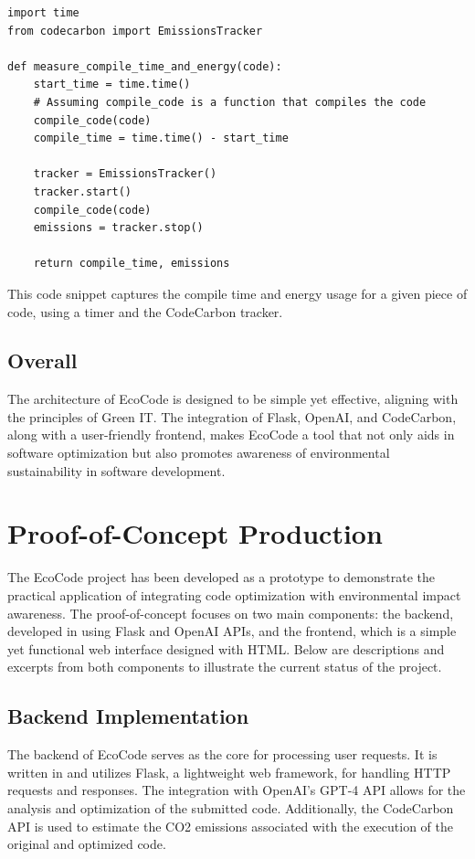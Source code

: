 \documentclass[conference,compsoc]{IEEEtran}
\begin{document}
\begin{verbatim}
import time
from codecarbon import EmissionsTracker

def measure_compile_time_and_energy(code):
    start_time = time.time()
    # Assuming compile_code is a function that compiles the code
    compile_code(code)
    compile_time = time.time() - start_time

    tracker = EmissionsTracker()
    tracker.start()
    compile_code(code)
    emissions = tracker.stop()

    return compile_time, emissions
\end{verbatim}

This code snippet captures the compile time and energy usage for a given piece of code, using a timer and the CodeCarbon tracker.

\subsection{Overall}
The architecture of EcoCode is designed to be simple yet effective, aligning with the principles of Green IT. The integration of Flask, OpenAI, and CodeCarbon, along with a user-friendly frontend, makes EcoCode a tool that not only aids in software optimization but also promotes awareness of environmental sustainability in software development.

\section{Proof-of-Concept Production}
The EcoCode project has been developed as a prototype to demonstrate the practical application of integrating code optimization with environmental impact awareness. The proof-of-concept focuses on two main components: the backend, developed in  using Flask and OpenAI APIs, and the frontend, which is a simple yet functional web interface designed with HTML. Below are descriptions and excerpts from both components to illustrate the current status of the project.

\subsection{Backend Implementation}
The backend of EcoCode serves as the core for processing user requests. It is written in  and utilizes Flask, a lightweight web framework, for handling HTTP requests and responses. The integration with OpenAI's GPT-4 API allows for the analysis and optimization of the submitted  code. Additionally, the CodeCarbon API is used to estimate the CO2 emissions associated with the execution of the original and optimized code.
\end{document}
